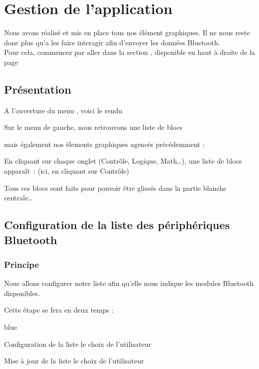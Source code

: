 \chapter{Gestion de l'application}

Nous avons réalisé et mis en place tous nos élément graphiques. Il ne nous reste donc plus qu'a les faire interagir afin d'envoyer les données Bluetooth. \\
\noindent
Pour cela, commencez par aller dans la section , disponible en haut à droite de la page


\newpage
\section{Présentation}
A l'ouverture du menu , voici le rendu

Sur le menu de gauche, nous retrouvons une liste de blocs 

 \label{place_menu_left}

mais également nos élements graphiques agencés précédemment : 


En cliquant sur chaque onglet (Contrôle, Logique, Math…), une liste de blocs apparaît :
(ici, en cliquant sur Contrôle)


Tous ces blocs sont faits pour pouvoir être glissés dans la partie blanche centrale…


\section{Configuration de la liste des périphériques Bluetooth}

\subsection{Principe}

Nous allons configurer notre liste  afin qu'elle nous indique les modules Bluetooth disponibles.

Cette étape se fera en deux temps : 

\begin{items}{blue}{\Triangle}
    \item Configuration de la liste  le choix de l'utilisateur
    \item Mise à jour de la liste  le choix de l'utilisateur
\end{items}


